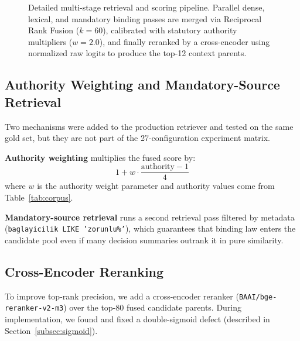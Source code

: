 \documentclass[11pt,a4paper,twocolumn]{article}
\begin{document}
\begin{figure}[t]
\caption{Detailed multi-stage retrieval and scoring pipeline. Parallel dense, lexical, and mandatory binding passes are merged via Reciprocal Rank Fusion ($k{=}60$), calibrated with statutory authority multipliers ($w{=}2.0$), and finally reranked by a cross-encoder using normalized raw logits to produce the top-12 context parents.}
\label{fig:retrieval}
\end{figure}

\subsection{Authority Weighting and Mandatory-Source Retrieval}
\label{subsec:authority}

Two mechanisms were added to the production retriever and tested on the same gold set, but they are not part of the 27-configuration experiment matrix.

\textbf{Authority weighting} multiplies the fused score by:
\begin{equation}
  1 + w \cdot \frac{\text{authority} - 1}{4}
  \label{eq:auth}
\end{equation}
where $w$ is the authority weight parameter and authority values come from Table~\ref{tab:corpus}.

\textbf{Mandatory-source retrieval} runs a second retrieval pass filtered by metadata (\texttt{baglayicilik LIKE 'zorunlu\%'}), which guarantees that binding law enters the candidate pool even if many decision summaries outrank it in pure similarity.

\subsection{Cross-Encoder Reranking}
\label{subsec:reranking}

To improve top-rank precision, we add a cross-encoder reranker (\texttt{BAAI/bge-reranker-v2-m3}) over the top-80 fused candidate parents. During implementation, we found and fixed a double-sigmoid defect (described in Section~\ref{subsec:sigmoid}).
\end{document}
